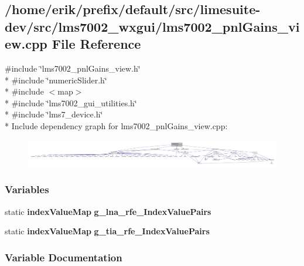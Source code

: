 \subsection{/home/erik/prefix/default/src/limesuite-\/dev/src/lms7002\+\_\+wxgui/lms7002\+\_\+pnl\+Gains\+\_\+view.cpp File Reference}
\label{lms7002__pnlGains__view_8cpp}
{\ttfamily \#include \char`\"{}lms7002\+\_\+pnl\+Gains\+\_\+view.\+h\char`\"{}}\\*
{\ttfamily \#include \char`\"{}numeric\+Slider.\+h\char`\"{}}\\*
{\ttfamily \#include $<$map$>$}\\*
{\ttfamily \#include \char`\"{}lms7002\+\_\+gui\+\_\+utilities.\+h\char`\"{}}\\*
{\ttfamily \#include \char`\"{}lms7\+\_\+device.\+h\char`\"{}}\\*
Include dependency graph for lms7002\+\_\+pnl\+Gains\+\_\+view.\+cpp\+:
\nopagebreak
\begin{figure}[H]
\begin{center}
\leavevmode
\includegraphics[width=350pt]{d9/def/lms7002__pnlGains__view_8cpp__incl}
\end{center}
\end{figure}
\subsubsection*{Variables}
\begin{DoxyCompactItemize}
\item 
static {\bf index\+Value\+Map} {\bf g\+\_\+lna\+\_\+rfe\+\_\+\+Index\+Value\+Pairs}
\item 
static {\bf index\+Value\+Map} {\bf g\+\_\+tia\+\_\+rfe\+\_\+\+Index\+Value\+Pairs}
\end{DoxyCompactItemize}


\subsubsection{Variable Documentation}
